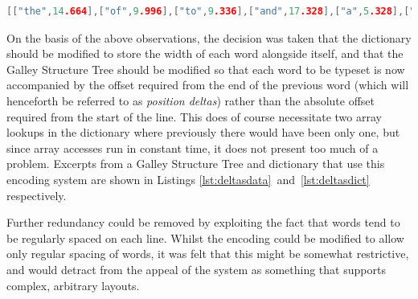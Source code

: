 \begin{lstlisting}[label=lst:deltasdict,captionpos=b,float,language=c,stringstyle=\color{blue},basicstyle=\ttfamily\footnotesize,caption={[Excerpt from a dictionary storing word widths]Excerpt from the dictionary from a JavaScript data file that uses position deltas, where the width of each word is stored alongside the word itself.}]
 [["the",14.664],["of",9.996],["to",9.336],["and",17.328],["a",5.328],["is",8.004],["be",11.328],["in",9.336],["as",9.996],["document",47.328],["that",18],["it",6.672],["page",22.656],["for",13.992],["are",14.652],["by",12],["on",12],["will",18.672],["which",29.328],["with",21.336],["this",17.34],["The",18.66],["can",16.656],["an",11.328],["or",9.996],["-",3.996],["eBook",31.332],["used",21.996],["PDF",22.008],["In",9.996],["layout",30],["have",22.656],["from",23.328],["not",15.336],["at",8.664],["width",27.336],["This",21.336],["has",15.996],["then",20.664],["each",21.984],["was",18.66],["typesetting",52.668],["columns",40.668],["simply",32.676],["these",24.66],["text",18],["into",18.672],["hyphenation",59.328],["content",35.328],["quality",33.336],["column",36],["lines",22.668],["only",21.336],["line",18],["ACM",27.336],["our",15.996],["its",11.34],["structure",41.988],["Document",49.992],["penalty",35.328],["between",39.984],["galley",29.328],["order",25.32],["more",24.66],["COGs",30],["out",15.336],["end",17.328],["one",17.328],["use",15.996],["algorithm",46.668],["producing",48.66],["columns.",43.668],["galleys",33.996],["figure",28.656],["simple",32.004],["would",30],
\end{lstlisting}

On the basis of the above observations, the decision was taken that the dictionary should be modified to store the width of each word alongside itself, and that the Galley Structure Tree should be modified so that each word to be typeset is now accompanied by the offset required from the end of the previous word (which will henceforth be referred to as \emph{position deltas}) rather than the absolute offset required from the start of the line. This does of course necessitate two array lookups in the dictionary where previously there would have been only one, but since array accesses run in constant time, it does not present too much of a problem. Excerpts from a Galley Structure Tree and dictionary that use this encoding system are shown in Listings \ref{lst:deltasdata}~and~\ref{lst:deltasdict} respectively.

Further redundancy could be removed by exploiting the fact that words tend to be regularly spaced on each line. Whilst the encoding could be modified to allow only regular spacing of words, it was felt that this might be somewhat restrictive, and would detract from the appeal of the system as something that supports complex, arbitrary layouts.

